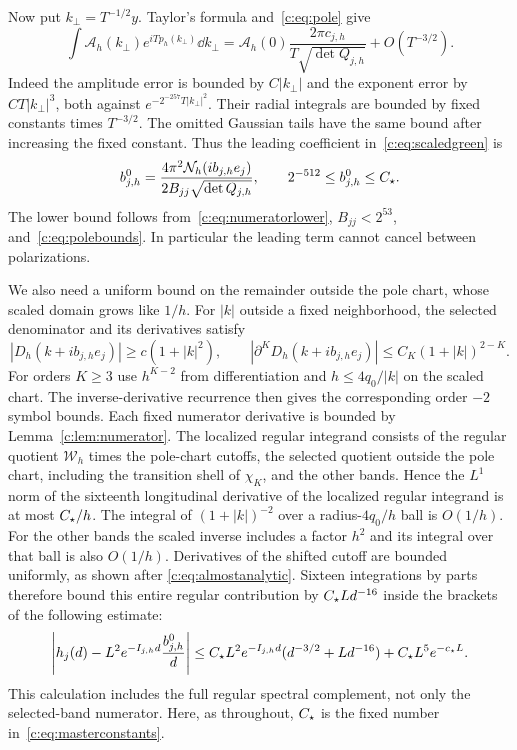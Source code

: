 Now put $k_\perp=T^{-1/2}y$. Taylor's formula and~\eqref{c:eq:pole} give
\[
 \int \mathcal A_h(k_\perp)e^{iTp_h(k_\perp)}\dd k_\perp
 =\mathcal A_h(0)\frac{2\pi c_{j,h}}{T\sqrt{\det Q_{j,h}}}
    +O(T^{-3/2}).
\]
Indeed the amplitude error is bounded by $C|k_\perp|$ and the exponent error
by $CT|k_\perp|^3$, both against $e^{-2^{-257}T|k_\perp|^2}$. Their radial
integrals are bounded by fixed constants times $T^{-3/2}$.
The omitted Gaussian tails have the same bound after increasing the
fixed constant. Thus the leading coefficient in~\eqref{c:eq:scaledgreen}
is
\begin{equation}
 b^0_{j,h}=\frac{4\pi^2\mathcal N_h(ib_{j,h}e_j)}
 {2B_{jj}\sqrt{\det Q_{j,h}}},\qquad
 2^{-512}\le b^0_{j,h}\le C_\star.                         \label{c:eq:leadingcoefficient}
\end{equation}
The lower bound follows from~\eqref{c:eq:numeratorlower},
$B_{jj}<2^{53}$, and~\eqref{c:eq:polebounds}. In particular the leading
term cannot cancel between polarizations.

We also need a uniform bound on the remainder outside the pole chart,
whose scaled domain grows like $1/h$. For $|k|$ outside a fixed
neighborhood, the selected denominator and its derivatives satisfy
\[
 |D_h(k+ib_{j,h}e_j)|\ge c(1+|k|^2),\qquad
 |\partial^K D_h(k+ib_{j,h}e_j)|
 \le C_K(1+|k|)^{2-K}.
\]
For orders $K\ge3$ use $h^{K-2}$ from differentiation and
$h\le4q_0/|k|$ on the scaled chart. The inverse-derivative recurrence
then gives the corresponding order $-2$ symbol bounds. Each fixed
numerator derivative is bounded by Lemma~\ref{c:lem:numerator}. The
localized regular integrand consists of the regular quotient $\mathcal W_h$ times
the pole-chart cutoffs, the selected quotient outside the pole chart,
including the transition shell of $\chi_K$, and the other bands. Hence the
$L^1$ norm of the sixteenth longitudinal derivative of the localized
regular integrand is at most $C_\star/h$. The integral of
$(1+|k|)^{-2}$ over a radius-$4q_0/h$ ball is $O(1/h)$.
For the other bands the scaled inverse includes a factor $h^2$ and
its integral over that ball is also $O(1/h)$. Derivatives of the
shifted cutoff are bounded uniformly, as shown after
\eqref{c:eq:almostanalytic}. Sixteen integrations by parts therefore
bound this entire regular contribution by $C_\star Ld^{-16}$ inside the
brackets of the following estimate:
\begin{equation}
 \left|h_j(d)-L^2e^{-I_{j,h}d}\frac{b^0_{j,h}}d\right|
 \le C_\star L^2e^{-I_{j,h}d}
       (d^{-3/2}+Ld^{-16})+C_\star L^5e^{-c_\star L}.          \label{c:eq:greenremainder}
\end{equation}
This calculation includes the full regular spectral complement, not
only the selected-band numerator. Here, as throughout, $C_\star$ is the
fixed number in~\eqref{c:eq:masterconstants}.

